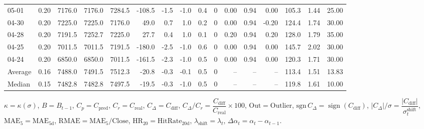\begin{threeparttable}
{\begin{tabular}{lrrrrrrrrrrrrrrr}
  05-01 &     0.20 & 7176.0 & 7176.0 & 7284.5 &     -108.5 &           -1.5 &                     -1.0 &                 0.4 &              0 &       0.00 &      0.94 &           0.00 &            105.3 &            1.44 &                  25.00 \\
  04-30 &     0.20 & 7225.0 & 7225.0 & 7176.0 &       49.0 &            0.7 &                      1.0 &                 0.2 &              0 &       0.00 &      0.94 &          -0.20 &            124.4 &            1.74 &                  30.00 \\
  04-28 &     0.20 & 7191.5 & 7252.7 & 7225.0 &       27.7 &            0.4 &                      1.0 &                 0.1 &              0 &       0.20 &      0.94 &           0.20 &            128.0 &            1.79 &                  35.00 \\
  04-25 &     0.20 & 7011.5 & 7011.5 & 7191.5 &     -180.0 &           -2.5 &                     -1.0 &                 0.6 &              0 &       0.00 &      0.94 &           0.00 &            145.7 &            2.02 &                  30.00 \\
  04-24 &     0.20 & 6850.0 & 6850.0 & 7011.5 &     -161.5 &           -2.3 &                     -1.0 &                 0.5 &              0 &       0.00 &      0.94 &           0.00 &            120.3 &            1.71 &                  30.00 \\
Average &     0.16 & 7488.0 & 7491.5 & 7512.3 &      -20.8 &           -0.3 &                     -0.1 &                 0.5 &              0 &         -- &        -- &             -- &            113.4 &            1.51 &                  13.83 \\
 Median &     0.15 & 7482.8 & 7482.8 & 7497.5 &      -19.5 &           -0.3 &                     -1.0 &                 0.5 &              0 &         -- &        -- &             -- &            119.8 &            1.61 &                  10.00 \\
\bottomrule
\end{tabular}
}
\begin{tablenotes}\footnotesize
\item $\kappa=\kappa(\sigma)$, $B=B_{t-1}$, $C_p=C_{\text{pred}}$, $C_r=C_{\text{real}}$, $C_\Delta=C_{\text{diff}}$, $C_\Delta/C_r=\dfrac{C_{\text{diff}}}{C_{\text{real}}}\times100$, $\mathrm{Out}=\text{Outlier}$, $\mathrm{sgn}\,C_\Delta=\operatorname{sign}(C_{\text{diff}})$, $|C_\Delta|/\sigma=\dfrac{|C_{\text{diff}}|}{\sigma_t^{\text{shift}}}$, $\mathrm{MAE}_5=\mathrm{MAE}_{5\text{d}}$, $\mathrm{RMAE}= \mathrm{MAE}_5 / \text{Close}$, $\mathrm{HR}_{20}=\mathrm{HitRate}_{20\text{d}}$, 
$\lambda_{\text{shift}}=\lambda_t$, 
$\Delta\alpha_t=\alpha_t-\alpha_{t-1}$.
\end{tablenotes}
\end{threeparttable}
\endgroup

